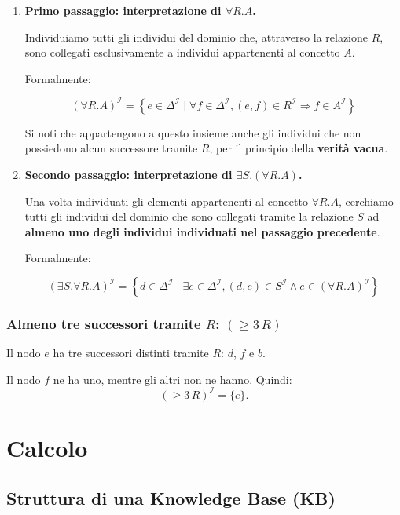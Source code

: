 \begin{enumerate}
    \item \textbf{Primo passaggio: interpretazione di $\forall R.A$.}

    Individuiamo tutti gli individui del dominio che,
    attraverso la relazione $R$, sono collegati
    esclusivamente a individui appartenenti al concetto $A$.

    Formalmente:

    \[
    (\forall R.A)^{\mathcal I}
    =
    \left\{
    e\in\Delta^{\mathcal I}
    \mid
    \forall f\in\Delta^{\mathcal I},
    (e,f)\in R^{\mathcal I}
    \Rightarrow f\in A^{\mathcal I}
    \right\}
    \]

    Si noti che appartengono a questo insieme anche gli
    individui che non possiedono alcun successore tramite
    $R$, per il principio della \textbf{verità vacua}.

    \item \textbf{Secondo passaggio: interpretazione di
    $\exists S.(\forall R.A)$.}

    Una volta individuati gli elementi appartenenti
    al concetto $\forall R.A$, cerchiamo tutti gli
    individui del dominio che sono collegati tramite
    la relazione $S$ ad \textbf{almeno uno degli individui
    individuati nel passaggio precedente}.

    Formalmente:

    \[
    (\exists S.\forall R.A)^{\mathcal I}
    =
    \left\{
    d\in\Delta^{\mathcal I}
    \mid
    \exists e\in\Delta^{\mathcal I},
    (d,e)\in S^{\mathcal I}
    \land
    e\in(\forall R.A)^{\mathcal I}
    \right\}
    \]
\end{enumerate}

\subsubsection{Almeno tre successori tramite \(R\): \((\geq 3\,R)\)}

Il nodo \(e\) ha tre successori distinti tramite \(R\): \(d\), \(f\) e \(b\).

Il nodo \(f\) ne ha uno, mentre gli altri non ne hanno. Quindi:
\[
    (\geq 3\,R)^{\mathcal I}=\{e\}.
\]

\section{Calcolo}
\subsection{Struttura di una Knowledge Base (KB)}

